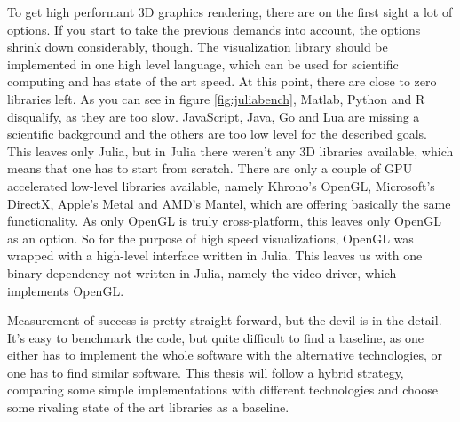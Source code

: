 To get high performant 3D graphics rendering, there are on the first sight a lot of options.
If you start to take the previous demands into account, the options shrink down considerably, though.
The visualization library should be implemented in one high level language, which can be used for scientific computing and has state of the art speed. At this point, there are close to zero libraries left. As you can see in figure \ref{fig:juliabench}, Matlab, Python and R disqualify, as they are too slow. JavaScript, Java, Go and Lua are missing a scientific background and the others are too low level for the described goals.
This leaves only Julia, but in Julia there weren't any 3D libraries available, which means that one has to start from scratch.
There are only a couple of GPU accelerated low-level libraries available, namely Khrono's OpenGL, Microsoft's DirectX, Apple's Metal and AMD's Mantel, which are offering basically the same functionality. As only OpenGL is truly cross-platform, this leaves only OpenGL as an option.
So for the purpose of high speed visualizations, OpenGL was wrapped with a high-level interface written in Julia. This leaves us with one binary dependency not written in Julia, namely the video driver, which implements OpenGL.

Measurement of success is pretty straight forward, but the devil is in the detail.
It's easy to benchmark the code, but quite difficult to find a baseline, as one either has to implement the whole software with the alternative technologies, or one has to find similar software.
This thesis will follow a hybrid strategy, comparing some simple implementations with different technologies and choose some rivaling state of the art libraries as a baseline.


